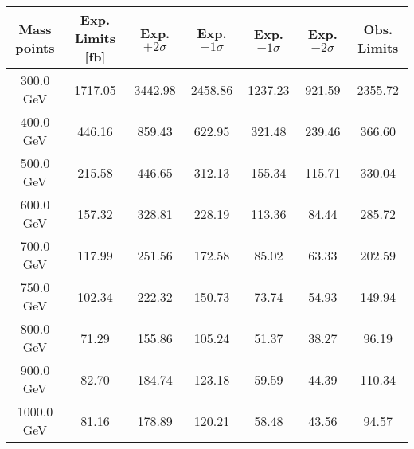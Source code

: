 
\begin{table}
\begin{center}
\begin{tabular}{c|cccccc}
\hline
\hline
Mass points & Exp. Limits [fb] & Exp. $+2\sigma$ & Exp. $+1\sigma$ &  Exp. $-1\sigma$  &  Exp. $-2\sigma$ & Obs. Limits \\
\hline
300.0 GeV  &  1717.05  & 3442.98  & 2458.86  & 1237.23  & 921.59   & 2355.72\\
400.0 GeV  &  446.16  & 859.43  & 622.95  & 321.48  & 239.46   & 366.60\\
500.0 GeV  &  215.58  & 446.65  & 312.13  & 155.34  & 115.71   & 330.04\\
600.0 GeV  &  157.32  & 328.81  & 228.19  & 113.36  & 84.44   & 285.72\\
700.0 GeV  &  117.99  & 251.56  & 172.58  & 85.02  & 63.33   & 202.59\\
750.0 GeV  &  102.34  & 222.32  & 150.73  & 73.74  & 54.93   & 149.94\\
800.0 GeV  &  71.29  & 155.86  & 105.24  & 51.37  & 38.27   & 96.19\\
900.0 GeV  &  82.70  & 184.74  & 123.18  & 59.59  & 44.39   & 110.34\\
1000.0 GeV  &  81.16  & 178.89  & 120.21  & 58.48  & 43.56   & 94.57\\

\hline
\hline
\end{tabular}
\end{center}
\end{table}
